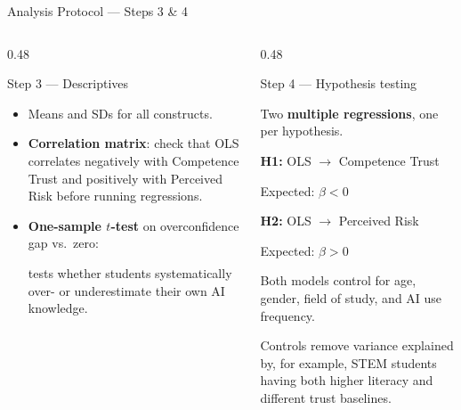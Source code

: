\documentclass[10pt,aspectratio=169]{beamer}
\begin{document}
\begin{frame}{Analysis Protocol --- Steps 3 \& 4}

\begin{columns}[T,onlytextwidth]

  \begin{column}{0.48\textwidth}
    \begin{block}{Step 3 --- Descriptives}
    \scriptsize
      \begin{itemize}
        \item Means and SDs for all constructs.

        \item \textbf{Correlation matrix}: check that OLS correlates negatively
        with Competence Trust and positively with Perceived Risk before
        running regressions.

        \item \textbf{One-sample $t$-test} on overconfidence gap vs.\ zero:
        
        tests whether students systematically over- or underestimate their own
        AI knowledge.
      \end{itemize}
    \end{block}
  \end{column}

  \begin{column}{0.48\textwidth}
    \begin{block}{Step 4 --- Hypothesis testing}
    \scriptsize

      Two \textbf{multiple regressions}, one per hypothesis.

      \medskip

      \textbf{H1:} OLS $\rightarrow$ Competence Trust
      
      Expected: $\beta < 0$

      \medskip

      \textbf{H2:} OLS $\rightarrow$ Perceived Risk
      
      Expected: $\beta > 0$

      \medskip

      Both models control for age, gender, field of study, and AI use frequency.

      \medskip

      Controls remove variance explained by, for example, STEM students having
      both higher literacy and different trust baselines.


\end{block}
\end{column}
\end{columns}
\end{frame}
\end{document}
